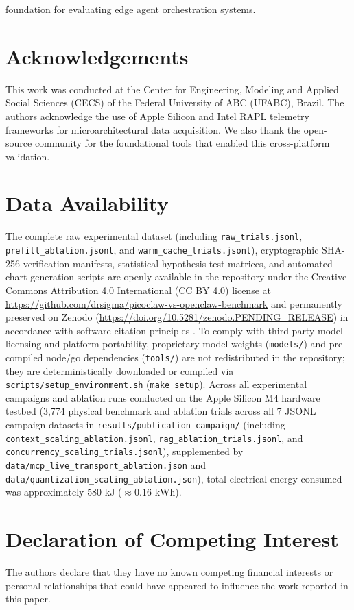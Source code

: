 \documentclass[preprint,12pt,3p]{elsarticle}
\begin{document}
foundation for evaluating edge agent orchestration systems.

\section*{Acknowledgements}
This work was conducted at the Center for Engineering, Modeling and Applied Social Sciences (CECS) of the Federal University of ABC (UFABC), Brazil. The authors acknowledge the use of Apple Silicon and Intel RAPL telemetry frameworks for microarchitectural data acquisition. We also thank the open-source community for the foundational tools that enabled this cross-platform validation.

\section*{Data Availability}
The complete raw experimental dataset (including \texttt{raw\_trials.jsonl}, \texttt{prefill\_ablation.jsonl}, and \texttt{warm\_cache\_trials.jsonl}), cryptographic SHA-256 verification manifests, statistical hypothesis test matrices, and automated chart generation scripts are openly available in the repository under the Creative Commons Attribution 4.0 International (CC BY 4.0) license at \url{https://github.com/drsigma/picoclaw-vs-openclaw-benchmark} and permanently preserved on Zenodo (\url{https://doi.org/10.5281/zenodo.PENDING_RELEASE}) in accordance with software citation principles \cite{smith2016software}. To comply with third-party model licensing and platform portability, proprietary model weights (\texttt{models/}) and pre-compiled node/go dependencies (\texttt{tools/}) are not redistributed in the repository; they are deterministically downloaded or compiled via \texttt{scripts/setup\_environment.sh} (\texttt{make setup}). Across all experimental campaigns and ablation runs conducted on the Apple Silicon M4 hardware testbed (3,774 physical benchmark and ablation trials across all 7 JSONL campaign datasets in \texttt{results/publication\_campaign/} (including \texttt{context\_scaling\_ablation.jsonl}, \texttt{rag\_ablation\_trials.jsonl}, and \texttt{concurrency\_scaling\_trials.jsonl}), supplemented by \texttt{data/mcp\_live\_transport\_ablation.json} and \texttt{data/quantization\_scaling\_ablation.json}), total electrical energy consumed was approximately $580\text{ kJ}$ ($\approx 0.16\text{ kWh}$).

\section*{Declaration of Competing Interest}
The authors declare that they have no known competing financial interests or personal relationships that could have appeared to influence the work reported in this paper.



\end{document}
